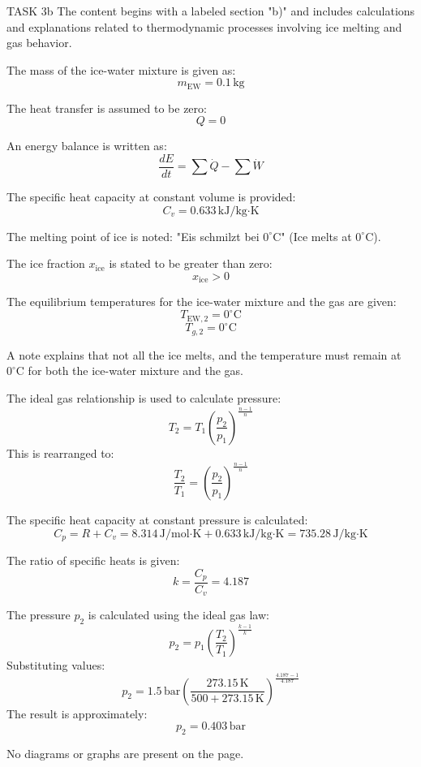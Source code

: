 TASK 3b  
The content begins with a labeled section "b)" and includes calculations and explanations related to thermodynamic processes involving ice melting and gas behavior.  

The mass of the ice-water mixture is given as:  
\[
m_{\text{EW}} = 0.1 \, \text{kg}
\]  

The heat transfer is assumed to be zero:  
\[
Q = 0
\]  

An energy balance is written as:  
\[
\frac{dE}{dt} = \sum \dot{Q} - \sum \dot{W}
\]  

The specific heat capacity at constant volume is provided:  
\[
C_v = 0.633 \, \text{kJ/kg·K}
\]  

The melting point of ice is noted:  
"Eis schmilzt bei \( 0^\circ\text{C} \)" (Ice melts at \( 0^\circ\text{C} \)).  

The ice fraction \( x_{\text{ice}} \) is stated to be greater than zero:  
\[
x_{\text{ice}} > 0
\]  

The equilibrium temperatures for the ice-water mixture and the gas are given:  
\[
T_{\text{EW},2} = 0^\circ\text{C}
\]  
\[
T_{g,2} = 0^\circ\text{C}
\]  

A note explains that not all the ice melts, and the temperature must remain at \( 0^\circ\text{C} \) for both the ice-water mixture and the gas.  

The ideal gas relationship is used to calculate pressure:  
\[
T_2 = T_1 \left( \frac{p_2}{p_1} \right)^{\frac{n-1}{n}}
\]  
This is rearranged to:  
\[
\frac{T_2}{T_1} = \left( \frac{p_2}{p_1} \right)^{\frac{n-1}{n}}
\]  

The specific heat capacity at constant pressure is calculated:  
\[
C_p = R + C_v = 8.314 \, \text{J/mol·K} + 0.633 \, \text{kJ/kg·K} = 735.28 \, \text{J/kg·K}
\]  

The ratio of specific heats is given:  
\[
k = \frac{C_p}{C_v} = 4.187
\]  

The pressure \( p_2 \) is calculated using the ideal gas law:  
\[
p_2 = p_1 \left( \frac{T_2}{T_1} \right)^{\frac{k-1}{k}}
\]  
Substituting values:  
\[
p_2 = 1.5 \, \text{bar} \left( \frac{273.15 \, \text{K}}{500 + 273.15 \, \text{K}} \right)^{\frac{4.187 - 1}{4.187}}
\]  
The result is approximately:  
\[
p_2 = 0.403 \, \text{bar}
\]  

No diagrams or graphs are present on the page.